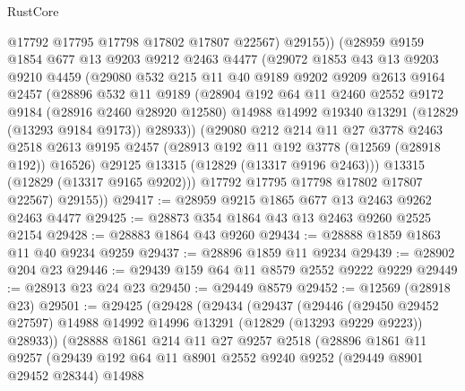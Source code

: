 \begin{lexlean}{RustCore}
\begin{coremodule}
            @17792
            @17795
            @17798
            @17802
            @17807
            @22567)
          @29155))
      (@28959
        @9159
        @1854
        @677
        @13
        @9203
        @9212
        @2463
        @4477
        (@29072
          @1853
          @43
          @13
          @9203
          @9210
          @4459
          (@29080
            @532
            @215
            @11
            @40
            @9189
            @9202
            @9209
            @2613
            @9164
            @2457
            (@28896
              @532
              @11
              @9189
              (@28904
                @192
                @64
                @11
                @2460
                @2552
                @9172
                @9184
                (@28916 @2460 @28920 @12580)
                @14988
                @14992
                @19340
                @13291
                (@12829 (@13293 @9184 @9173))
                @28933))
            (@29080
              @212
              @214
              @11
              @27
              @3778
              @2463
              @2518
              @2613
              @9195
              @2457
              (@28913 @192 @11 @192 @3778 (@12569 (@28918 @192)) @16526)
              @29125
              @13315
              (@12829 (@13317 @9196 @2463)))
            @13315
            (@12829 (@13317 @9165 @9202)))
          @17792
          @17795
          @17798
          @17802
          @17807
          @22567)
        @29155))
@29417 := @28959 @9215 @1865 @677 @13 @2463 @9262 @2463 @4477
@29425 := @28873 @354 @1864 @43 @13 @2463 @9260 @2525 @2154
@29428 := @28883 @1864 @43 @9260
@29434 := @28888 @1859 @1863 @11 @40 @9234 @9259
@29437 := @28896 @1859 @11 @9234
@29439 := @28902 @204 @23
@29446 := @29439 @159 @64 @11 @8579 @2552 @9222 @9229
@29449 := @28913 @23 @24 @23
@29450 := @29449 @8579
@29452 := @12569 (@28918 @23)
@29501 := @29425
    (@29428
      (@29434
        (@29437
          (@29446
            (@29450 @29452 @27597)
            @14988
            @14992
            @14996
            @13291
            (@12829 (@13293 @9229 @9223))
            @28933))
        (@28888
          @1861
          @214
          @11
          @27
          @9257
          @2518
          (@28896
            @1861
            @11
            @9257
            (@29439
              @192
              @64
              @11
              @8901
              @2552
              @9240
              @9252
              (@29449 @8901 @29452 @28344)
              @14988

\end{coremodule}
\end{lexlean}
